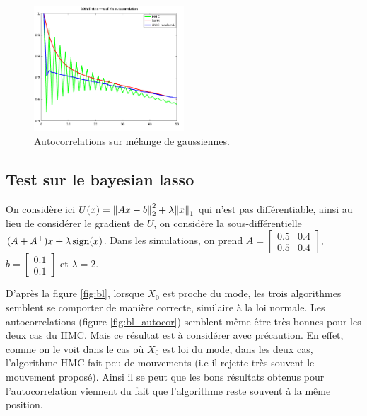 \documentclass[10pt,a4paper]{article}
\begin{document}
\begin{figure}[ht]
  \centering
  \includegraphics[width=0.5\textwidth]{figs/gm_autocor.png}
  \caption{Autocorrelations sur mélange de gaussiennes. \label{fig:gm_autocor}}
\end{figure}

\subsection{Test sur le bayesian lasso}
On considère ici $U(x) = { \left\| Ax - b \right\|}_2^2 + \lambda { \left\| x \right\|}_1$ qui n'est pas différentiable, ainsi au lieu de considérer le gradient de $U$, on considère la sous-différentielle $(A + A^\top) x + \lambda \operatorname{sign}(x)$. Dans les simulations, on prend $A = \begin{bmatrix} 0.5 & 0.4 \\ 0.5 & 0.4 \end{bmatrix}$, $b = \begin{bmatrix} 0.1 \\ 0.1 \end{bmatrix}$ et $\lambda = 2$.

D'après la figure \ref{fig:bl}, lorsque $X_0$ est proche du mode, les trois algorithmes semblent se comporter de manière correcte, similaire à la loi normale. Les autocorrelations (figure \ref{fig:bl_autocor}) semblent même être très bonnes pour les deux cas du HMC. Mais ce résultat est à considérer avec précaution. En effet, comme on le voit dans le cas où $X_0$ est loi du mode, dans les deux cas, l'algorithme HMC fait peu de mouvements (i.e il rejette très souvent le mouvement proposé). Ainsi il se peut que les bons résultats obtenus pour l'autocorrelation viennent du fait que l'algorithme reste souvent à la même position. 
\end{document}
